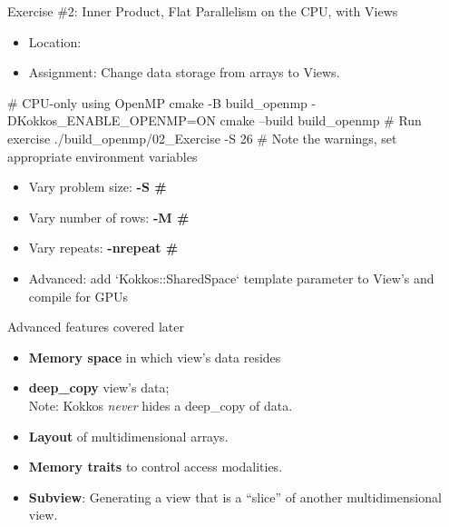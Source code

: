 \begin{frame}[fragile]{Exercise \#2: Inner Product, Flat Parallelism on the CPU, with Views}

  \begin{small}
  \begin{itemize}
  \item Location: 
  \item Assignment: Change data storage from arrays to Views.
  \end{itemize}
  \end{small}

\begin{code}
# CPU-only using OpenMP
cmake -B build_openmp -DKokkos_ENABLE_OPENMP=ON
cmake --build build_openmp
# Run exercise
./build_openmp/02_Exercise -S 26
# Note the warnings, set appropriate environment variables
\end{code}

  \begin{scriptsize}
  \begin{itemize}
  \item Vary problem size: \textbf{-S \#}
  \item Vary number of rows: \textbf{-M \#}
  \item Vary repeats: \textbf{-nrepeat \#}
  \item Advanced: add `Kokkos::SharedSpace` template parameter to View's and compile for GPUs
  \end{itemize}
  \end{scriptsize}

\end{frame}


\iffull
\begin{frame}[fragile]{Advanced features covered later}

  \begin{itemize}

  \item {\textbf{Memory space} in which view's data resides}

  \item {\textbf{deep\_copy} view's data; \\
        Note: Kokkos \textit{never} hides a deep\_copy of data.}

  \item {\textbf{Layout} of multidimensional arrays.}

  \item {\textbf{Memory traits} to control access modalities.}

  \item {\textbf{Subview}: Generating a view that is a ``slice'' of another multidimensional view.}

  \end{itemize}

\end{frame}
\fi

